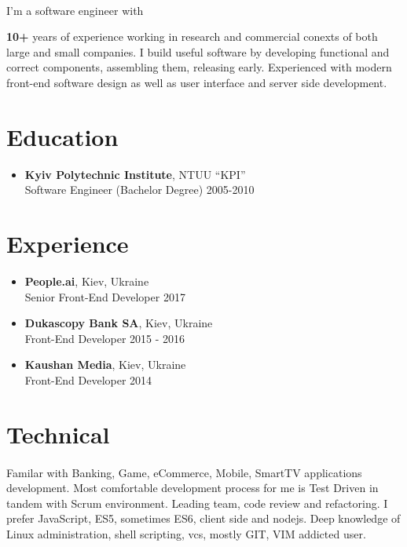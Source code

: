 \documentclass[a4paper,11pt]{article}
\begin{document}
\paragraph{} I'm a software engineer with {\textbf {\small{10+}} years of experience working in research and commercial
conexts of both large and small companies. I build useful software by developing functional and correct
components, assembling them, releasing early. Experienced with modern front-end software design as well as
user interface and server side development.

%
%

\section*{Education}
\begin{itemize}[itemsep=-4pt,label=]
  \item \textbf{Kyiv Polytechnic Institute}, NTUU ``KPI'' \\
  Software Engineer (Bachelor Degree) \hfill 2005-2010
\end{itemize}

%
%

\section*{Experience}
\begin{itemize}[itemsep=4pt,label=]

  \item \textbf{People.ai}, Kiev, Ukraine\\
    Senior Front-End Developer \hfill  2017

  \item \textbf{Dukascopy Bank SA}, Kiev, Ukraine\\
    Front-End Developer \hfill  2015 - 2016

  \item \textbf{Kaushan Media}, Kiev, Ukraine \\
    Front-End Developer \hfill  2014

\end{itemize}

%
%

\section*{Technical}
\paragraph{} Familar with Banking, Game, eCommerce, Mobile, SmartTV applications development. Most comfortable development process for me is Test Driven in tandem with Scrum environment. Leading team, code review and refactoring. I prefer JavaScript, ES5,
sometimes ES6, client side and nodejs. Deep knowledge of Linux administration, shell scripting, vcs, mostly GIT, VIM addicted user.

}
\end{document}
